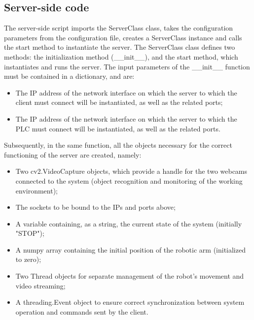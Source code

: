 \documentclass[a4paper,11pt]{report}
\theoremstyle{definition}
\theoremstyle{plain}
\begin{document}
        \subsection{Server-side code}
        The server-side script imports the ServerClass class, takes the configuration parameters from the configuration file, creates a ServerClass instance and calls the start method to instantiate the server. \newline
        The ServerClass class defines two methods: the initialization method (\_\_init\_\_), and the start method, which instantiates and runs the server.
        The input parameters of the \_\_init\_\_ function must be contained in a dictionary, and are:
        \begin{itemize}
            \item The IP address of the network interface on which the server to which the client must connect will be instantiated, as well as the related ports;
            \item The IP address of the network interface on which the server to which the PLC must connect will be instantiated, as well as the related ports.
        \end{itemize}
        Subsequently, in the same function, all the objects necessary for the correct functioning of the server are created, namely:
        \begin{itemize}
            \item Two cv2.VideoCapture objects, which provide a handle for the two webcams connected to the system (object recognition and monitoring of the working environment);
            \item The sockets to be bound to the IPs and ports above;
            \item A variable containing, as a string, the current state of the system (initially "STOP");
            \item A numpy array containing the initial position of the robotic arm (initialized to zero);
            \item Two Thread objects for separate management of the robot's movement and video streaming;
            \item A threading.Event object to ensure correct synchronization between system operation and commands sent by the client.
        \end{itemize}
\end{document}
